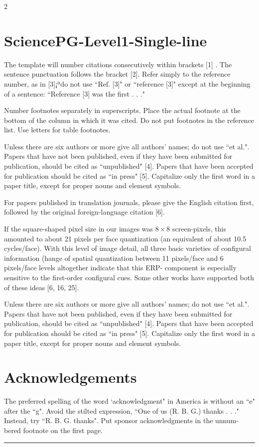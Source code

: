 ﻿\documentclass{book}
\theoremstyle{remark}
\begin{document}
\begin{multicols}{2}
\section{SciencePG-Level1-Single-line}
The template will number citations consecutively within brackets [1] . The sentence punctuation follows the bracket [2]. Refer simply to the reference number, as in [3]¡ªdo not use ``Ref. [3]" or ``reference [3]" except at the beginning of a sentence: ``Reference [3] was the first . . ."

Number footnotes separately in superscripts. Place the actual footnote at the bottom of the column in which it was cited. Do not put footnotes in the reference list. Use letters for table footnotes.

Unless there are six authors or more give all authors' names; do not use ``et al.". Papers that have not been published, even if they have been submitted for publication, should be cited as ``unpublished" [4]. Papers that have been accepted for publication should be cited as ``in press" [5]. Capitalize only the first word in a paper title, except for proper nouns and element symbols.

For papers published in translation journals, please give the English citation first, followed by the original foreign-language citation [6].

If the square-shaped pixel size in our images was $8 \times 8$ screen-pixels, this amounted to about 21 pixels per face quantization (an equivalent of about 10.5 cycles/face). With this level of image detail, all three basic varieties of configural information (hange of spatial quantization between 11 pixels/face and 6 pixels/face levels altogether indicate that this ERP- component is especially sensitive to the first-order configural cues. Some other works have supported both of these ideas [6, 16, 25].

Unless there are six authors or more give all authors' names; do not use ``et al.". Papers that have not been published, even if they have been submitted for publication, should be cited as ``unpublished" [4]. Papers that have been accepted for publication should be cited as ``in press" [5]. Capitalize only the first word in a paper title, except for proper nouns and element symbols.

\section*{Acknowledgements}
The preferred spelling of the word `acknowledgment" in America is without an ``e" after the ``g". Avoid the stilted expression, ``One of us (R. B. G.) thanks . . ." Instead, try ``R. B. G. thanks". Put sponsor acknowledgments in the unnum-bered footnote on the first page.

\parskip=5pt
\noindent \rule[0pt]{25em}{1pt}

\parskip=10pt
\vspace{-6pt}
\renewcommand{\bibsection}{}



\end{multicols}
\end{document}
